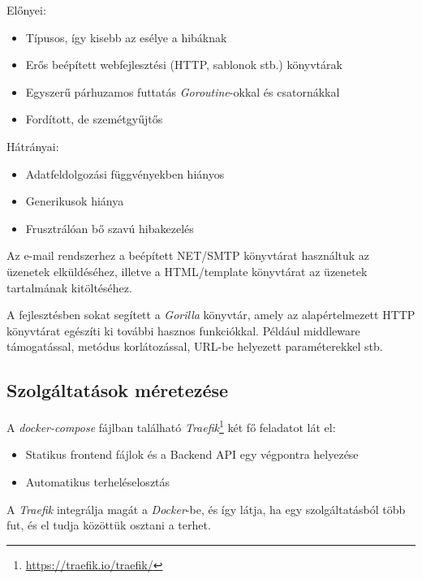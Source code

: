 \begin{samepage}
  \noindent Előnyei:
  \begin{itemize}
    \item Típusos, így kisebb az esélye a hibáknak
    \item Erős beépített webfejlesztési (HTTP, sablonok stb.) könyvtárak
    \item Egyszerű párhuzamos futtatás \emph{Goroutine}-okkal és csatornákkal
    \item Fordított, de szemétgyűjtős

  \end{itemize}
\end{samepage}

\begin{samepage}
  \noindent Hátrányai:
  \begin{itemize}
    \item Adatfeldolgozási függvényekben hiányos
    \item Generikusok hiánya
    \item Frusztrálóan bő szavú hibakezelés
  \end{itemize}
\end{samepage}

Az e-mail rendszerhez a beépített NET/SMTP könyvtárat használtuk az üzenetek elküldéséhez, illetve a HTML/template könyvtárat az üzenetek tartalmának kitöltéséhez.

A fejlesztésben sokat segített a \emph{Gorilla} könyvtár, amely az alapértelmezett HTTP könyvtárat egészíti ki további hasznos funkciókkal.
Például middleware támogatással, metódus korlátozással, URL-be helyezett paraméterekkel stb.

\subsection{Szolgáltatások méretezése}
A \emph{docker-compose} fájlban található \emph{Traefik}\footnote{\url{https://traefik.io/traefik/}} két fő feladatot lát el:

\begin{samepage}
  \begin{itemize}
    \item Statikus frontend fájlok és a Backend API egy végpontra helyezése
    \item Automatikus terheléselosztás
  \end{itemize}
\end{samepage}

A \emph{Traefik} integrálja magát a \emph{Docker}-be, és így látja, ha egy szolgáltatásból több fut, és el tudja közöttük osztani a terhet.

